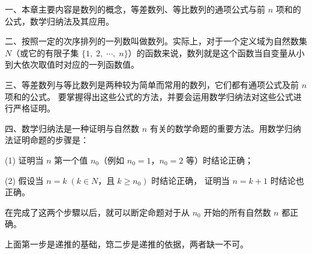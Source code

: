 \xiaojie

一、本章主要内容是数列的概念，等差数列、等比数列的通项公式与前 $n$ 项和的公式，数学归纳法及其应用。

二、按照一定的次序排列的一列数叫做数列。实际上，对于一个定义域为自然数集 $N$（或它的有限子集
$\{1,\; 2,\; \cdots ,\; n\}$）的函数来说，数列就是这个函数当自变量从小到大依次取值时对应的一列函数值。

三、等差数列与等比数列是两种较为简单而常用的数列，它们都有通项公式及前 $n$ 项和的公式。
要掌握得出这些公式的方法，并要会运用数学归纳法对这些公式进行严格证明。

四、数学归纳法是一种证明与自然数 $n$ 有关的数学命题的重要方法。用数学归纳法证明命题的步骤是：

(1) 证明当 $n$ 第一个值 $n_0$（例如 $n_0 = 1$，$n_0 = 2$ 等）时结论正确；

(2) 假设当 $n = k \; (k \in N \text{，且}\; k \geqslant n_0)$ 时结论正确， 证明当 $n = k + 1$ 时结论也正确。

在完成了这两个步驟以后，就可以断定命题对于从 $n_0$ 开始的所有自然数 $n$ 都正确。

上面第一步是递推的基础，筇二步是递推的依据，两者缺一不可。

